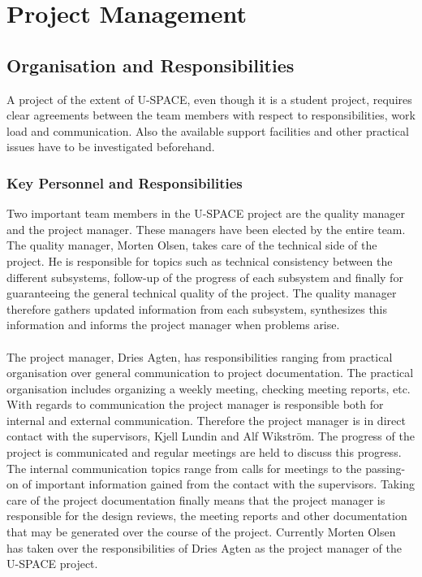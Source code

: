 \chapter{Project Management}
\label{chap:project_management}
%
\section{Organisation and Responsibilities}
%
A project of the extent of \ac{U-SPACE}, even though it is a student project, requires clear agreements between the team members with respect to responsibilities, work load and communication. Also the available support facilities and other practical issues have to be investigated beforehand.
%
\subsection{Key Personnel and Responsibilities}
%
Two important team members in the \ac{U-SPACE} project are the quality manager and the project manager. These managers have been elected by the entire team. The quality manager, Morten Olsen, takes care of the technical side of the project. He is responsible for topics such as technical consistency between the different subsystems, follow-up of the progress of each subsystem and finally for guaranteeing the general technical quality of the project. The quality manager therefore gathers updated information from each subsystem, synthesizes this information and informs the project manager when problems arise.
\\
\\
The project manager, Dries Agten, has responsibilities ranging from practical organisation over general communication to project documentation. The practical organisation includes organizing a weekly meeting, checking meeting reports, etc. With regards to communication the project manager is responsible both for internal and external communication. Therefore the project manager is in direct contact with the supervisors, Kjell Lundin and Alf Wikström. The progress of the project is communicated and regular meetings are held to discuss this progress.  The internal communication topics range from calls for meetings to the passing-on of important information gained from the contact with the supervisors. Taking care of the project documentation finally means that the project manager is responsible for the design reviews, the meeting reports and other documentation that may be generated over the course of the project. Currently Morten Olsen has taken over the responsibilities of Dries Agten as the project manager of the \ac{U-SPACE} project.

